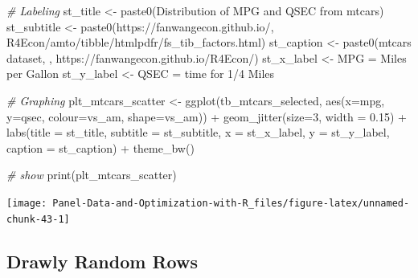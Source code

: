 \documentclass[
]{book}
\newenvironment{Shaded}{\begin{snugshade}}{\end{snugshade}}
\newcommand{\AttributeTok}[1]{\textcolor[rgb]{0.77,0.63,0.00}{#1}}
\newcommand{\CommentTok}[1]{\textcolor[rgb]{0.56,0.35,0.01}{\textit{#1}}}
\newcommand{\DecValTok}[1]{\textcolor[rgb]{0.00,0.00,0.81}{#1}}
\newcommand{\FloatTok}[1]{\textcolor[rgb]{0.00,0.00,0.81}{#1}}
\newcommand{\FunctionTok}[1]{\textcolor[rgb]{0.00,0.00,0.00}{#1}}
\newcommand{\NormalTok}[1]{#1}
\newcommand{\OtherTok}[1]{\textcolor[rgb]{0.56,0.35,0.01}{#1}}
\newcommand{\SpecialCharTok}[1]{\textcolor[rgb]{0.00,0.00,0.00}{#1}}
\newcommand{\StringTok}[1]{\textcolor[rgb]{0.31,0.60,0.02}{#1}}
\begin{document}
\begin{Shaded}
\begin{Highlighting}[]
\CommentTok{\# Labeling}
\NormalTok{st\_title }\OtherTok{\textless{}{-}} \FunctionTok{paste0}\NormalTok{(}\StringTok{\textquotesingle{}Distribution of MPG and QSEC from mtcars\textquotesingle{}}\NormalTok{)}
\NormalTok{st\_subtitle }\OtherTok{\textless{}{-}} \FunctionTok{paste0}\NormalTok{(}\StringTok{\textquotesingle{}https://fanwangecon.github.io/\textquotesingle{}}\NormalTok{,}
                      \StringTok{\textquotesingle{}R4Econ/amto/tibble/htmlpdfr/fs\_tib\_factors.html\textquotesingle{}}\NormalTok{)}
\NormalTok{st\_caption }\OtherTok{\textless{}{-}} \FunctionTok{paste0}\NormalTok{(}\StringTok{\textquotesingle{}mtcars dataset, \textquotesingle{}}\NormalTok{,}
                     \StringTok{\textquotesingle{}https://fanwangecon.github.io/R4Econ/\textquotesingle{}}\NormalTok{)}
\NormalTok{st\_x\_label }\OtherTok{\textless{}{-}} \StringTok{\textquotesingle{}MPG = Miles per Gallon\textquotesingle{}}
\NormalTok{st\_y\_label }\OtherTok{\textless{}{-}} \StringTok{\textquotesingle{}QSEC = time for 1/4 Miles\textquotesingle{}}

\CommentTok{\# Graphing}
\NormalTok{plt\_mtcars\_scatter }\OtherTok{\textless{}{-}} 
  \FunctionTok{ggplot}\NormalTok{(tb\_mtcars\_selected, }
         \FunctionTok{aes}\NormalTok{(}\AttributeTok{x=}\NormalTok{mpg, }\AttributeTok{y=}\NormalTok{qsec, }\AttributeTok{colour=}\NormalTok{vs\_am, }\AttributeTok{shape=}\NormalTok{vs\_am)) }\SpecialCharTok{+}
  \FunctionTok{geom\_jitter}\NormalTok{(}\AttributeTok{size=}\DecValTok{3}\NormalTok{, }\AttributeTok{width =} \FloatTok{0.15}\NormalTok{) }\SpecialCharTok{+}
  \FunctionTok{labs}\NormalTok{(}\AttributeTok{title =}\NormalTok{ st\_title, }\AttributeTok{subtitle =}\NormalTok{ st\_subtitle,}
       \AttributeTok{x =}\NormalTok{ st\_x\_label, }\AttributeTok{y =}\NormalTok{ st\_y\_label, }\AttributeTok{caption =}\NormalTok{ st\_caption) }\SpecialCharTok{+}
  \FunctionTok{theme\_bw}\NormalTok{()}

\CommentTok{\# show}
\FunctionTok{print}\NormalTok{(plt\_mtcars\_scatter)}
\end{Highlighting}
\end{Shaded}

\begin{center}\texttt{[image: Panel-Data-and-Optimization-with-R\_files/figure-latex/unnamed-chunk-43-1]} \end{center}

\hypertarget{drawly-random-rows}{%
\subsection{Drawly Random Rows}\label{drawly-random-rows}}
\end{document}
